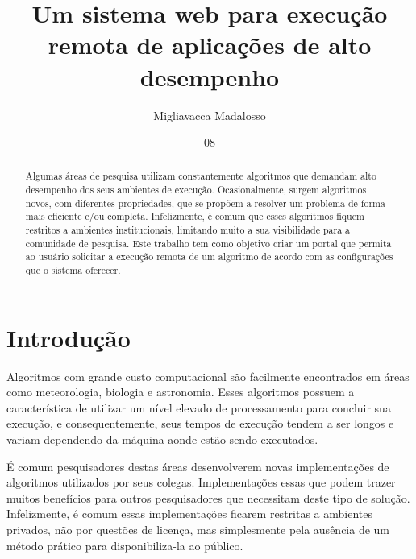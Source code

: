 \documentclass[tg]{mdtufsm}
\title{Um sistema web para execução remota de aplicações de alto desempenho}
\author{Migliavacca Madalosso}{Otávio}
\institute{Centro de Tecnologia}
\date{08}{Outubro}{2015}
\begin{document}
\maketitle
\makeapprove

\begin{abstract}
Algumas áreas de pesquisa utilizam constantemente algoritmos que demandam alto desempenho dos seus ambientes de execução. Ocasionalmente, surgem algoritmos novos, com diferentes propriedades, que se propõem a resolver um problema de forma mais eficiente e/ou completa. Infelizmente, é comum que esses algoritmos fiquem restritos a ambientes institucionais, limitando muito a sua visibilidade para a comunidade de pesquisa. Este trabalho tem como objetivo criar um portal que permita ao usuário solicitar a execução remota de um algoritmo de acordo com as configurações que o sistema oferecer.
\end{abstract}

\tableofcontents

\setlength{\baselineskip}{1.5\baselineskip}


\chapter{Introdução}

Algoritmos com grande custo computacional são facilmente encontrados em áreas como meteorologia, biologia e astronomia. Esses algoritmos possuem a característica de utilizar um nível elevado de processamento para concluir sua execução, e consequentemente, seus tempos de execução tendem a ser longos e variam dependendo da máquina aonde estão sendo executados.

É comum pesquisadores destas áreas desenvolverem novas implementações de algoritmos utilizados por seus colegas. Implementações essas que podem trazer muitos benefícios para outros pesquisadores que necessitam deste tipo de solução. Infelizmente, é comum essas implementações ficarem restritas a ambientes privados, não por questões de licença, mas simplesmente pela ausência de um método prático para disponibiliza-la ao público.
\end{document}
